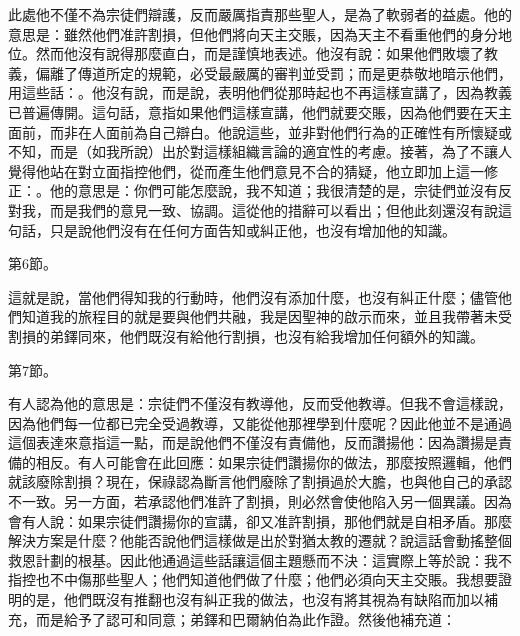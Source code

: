 此處他不僅不為宗徒們辯護，反而嚴厲指責那些聖人，是為了軟弱者的益處。他的意思是：雖然他們准許割損，但他們將向天主交賬，因為天主不看重他們的身分地位。然而他沒有說得那麼直白，而是謹慎地表述。他沒有說：如果他們敗壞了教義，偏離了傳道所定的規範，必受最嚴厲的審判並受罰；而是更恭敬地暗示他們，用這些話：。他沒有說，而是說，表明他們從那時起也不再這樣宣講了，因為教義已普遍傳開。這句話，意指如果他們這樣宣講，他們就要交賬，因為他們要在天主面前，而非在人面前為自己辯白。他說這些，並非對他們行為的正確性有所懷疑或不知，而是（如我所說）出於對這樣組織言論的適宜性的考慮。接著，為了不讓人覺得他站在對立面指控他們，從而產生他們意見不合的猜疑，他立即加上這一修正：。他的意思是：你們可能怎麼說，我不知道；我很清楚的是，宗徒們並沒有反對我，而是我們的意見一致、協調。這從他的措辭可以看出；但他此刻還沒有說這句話，只是說他們沒有在任何方面告知或糾正他，也沒有增加他的知識。\par

第6節。\par

這就是說，當他們得知我的行動時，他們沒有添加什麼，也沒有糾正什麼；儘管他們知道我的旅程目的就是要與他們共融，我是因聖神的啟示而來，並且我帶著未受割損的弟鐸同來，他們既沒有給他行割損，也沒有給我增加任何額外的知識。\par

第7節。\par

有人認為他的意思是：宗徒們不僅沒有教導他，反而受他教導。但我不會這樣說，因為他們每一位都已完全受過教導，又能從他那裡學到什麼呢？因此他並不是通過這個表達來意指這一點，而是說他們不僅沒有責備他，反而讚揚他：因為讚揚是責備的相反。有人可能會在此回應：如果宗徒們讚揚你的做法，那麼按照邏輯，他們就該廢除割損？現在，保祿認為斷言他們廢除了割損過於大膽，也與他自己的承認不一致。另一方面，若承認他們准許了割損，則必然會使他陷入另一個異議。因為會有人說：如果宗徒們讚揚你的宣講，卻又准許割損，那他們就是自相矛盾。那麼解決方案是什麼？他能否說他們這樣做是出於對猶太教的遷就？說這話會動搖整個救恩計劃的根基。因此他通過這些話讓這個主題懸而不決：這實際上等於說：我不指控也不中傷那些聖人；他們知道他們做了什麼；他們必須向天主交賬。我想要證明的是，他們既沒有推翻也沒有糾正我的做法，也沒有將其視為有缺陷而加以補充，而是給予了認可和同意；弟鐸和巴爾納伯為此作證。然後他補充道：\par

